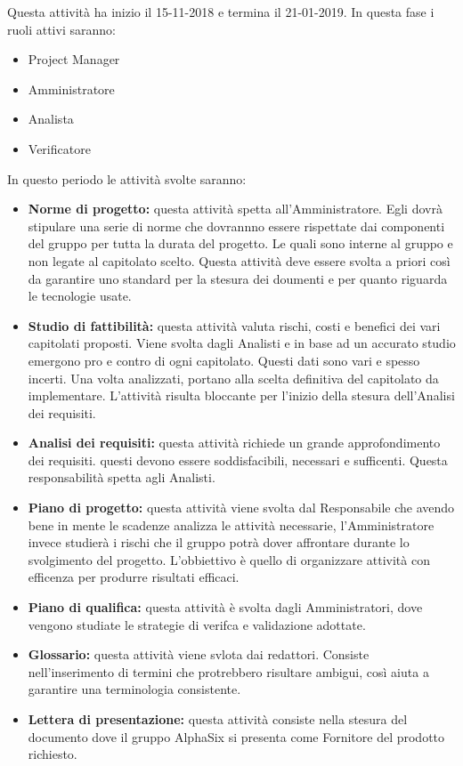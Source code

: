 		Questa attività ha inizio il 15-11-2018 e termina il 21-01-2019. In questa fase i ruoli attivi saranno: 
		\begin{itemize}
			\item Project Manager
			\item Amministratore
			\item Analista
			\item Verificatore
		\end{itemize}
		In questo periodo le attività svolte saranno:
		\begin{itemize}
			\item \textbf{Norme di progetto:} questa attività spetta all'Amministratore. Egli dovrà stipulare una serie di norme che dovrannno essere rispettate dai componenti del gruppo per tutta la durata del progetto. Le quali sono interne al gruppo e non legate al capitolato scelto. Questa attività deve essere svolta a priori così da garantire uno standard per la stesura dei doumenti e per quanto riguarda le tecnologie usate.
			\item \textbf{Studio di fattibilità:} questa attività valuta rischi, costi e benefici dei vari capitolati proposti. Viene svolta dagli Analisti e in base ad un accurato studio emergono pro e contro di ogni capitolato. Questi dati sono vari e spesso incerti. Una volta analizzati, portano alla scelta definitiva del capitolato da implementare. L'attività risulta bloccante per l'inizio della stesura dell'Analisi dei requisiti.
			\item \textbf{Analisi dei requisiti:} questa attività richiede un grande approfondimento dei requisiti. questi devono essere soddisfacibili, necessari e sufficenti. Questa responsabilità spetta agli Analisti. 
			\item \textbf{Piano di progetto:} questa attività viene svolta dal Responsabile che avendo bene in mente le scadenze analizza le attività necessarie, l'Amministratore invece studierà i rischi che il gruppo potrà dover affrontare durante lo svolgimento del progetto. L'obbiettivo è quello di organizzare attività con efficenza per produrre risultati efficaci.
			\item \textbf{Piano di qualifica:} questa attività è svolta dagli Amministratori, dove vengono studiate le strategie di verifca e validazione adottate.
			\item \textbf{Glossario:} questa attività viene svlota dai redattori. Consiste nell'inserimento di termini che protrebbero risultare ambigui, così aiuta a garantire una terminologia consistente.
			\item \textbf{Lettera di presentazione:} questa attività consiste nella stesura del documento dove il gruppo AlphaSix si presenta come Fornitore del prodotto richiesto.
		\end{itemize}
		
